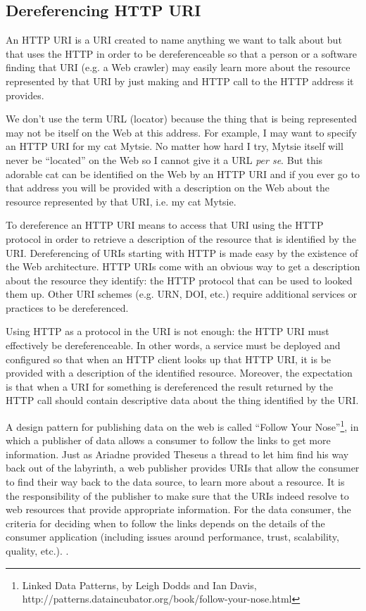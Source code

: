 \hypertarget{dereferencing-http-uri}{%
\subsection{Dereferencing HTTP URI }\label{dereferencing-http-uri}}

An HTTP URI is a URI created to name anything we want to talk about but
that uses the HTTP in order to be dereferenceable so that a person or a
software finding that URI (e.g. a Web crawler) may easily learn more
about the resource represented by that URI by just making and HTTP call
to the HTTP address it provides.

We don't use the term URL (locator) because the thing that is being
represented may not be itself on the Web at this address. For example, I
may want to specify an HTTP URI for my cat Mytsie. No matter how hard I
try, Mytsie itself will never be ``located'' on the Web so I cannot give
it a URL \emph{per se}. But this adorable cat can be identified on the
Web by an HTTP URI and if you ever go to that address you will be
provided with a description on the Web about the resource represented by
that URI, i.e. my cat Mytsie.

To dereference an HTTP URI means to access that URI using the HTTP
protocol in order to retrieve a description of the resource that is
identified by the URI. Dereferencing of URIs starting with HTTP is made
easy by the existence of the Web architecture. HTTP URIs come with an
obvious way to get a description about the resource they identify: the
HTTP protocol that can be used to looked them up. Other URI schemes
(e.g. URN, DOI, etc.) require additional services or practices to be
dereferenced.

Using HTTP as a protocol in the URI is not enough: the HTTP URI must
effectively be dereferenceable. In other words, a service must be
deployed and configured so that when an HTTP client looks up that HTTP
URI, it is be provided with a description of the identified resource.
Moreover, the expectation is that when a URI for something is
dereferenced the result returned by the HTTP call should contain
descriptive data about the thing identified by the URI.

A design pattern for publishing data on the web is called ``Follow Your
Nose''\footnote{Linked Data Patterns, by Leigh Dodds and Ian Davis,
  http://patterns.dataincubator.org/book/follow-your-nose.html}, in
which a publisher of data allows a consumer to follow the links to get
more information. Just as Ariadne provided Theseus a thread to let him
find his way back out of the labyrinth, a web publisher provides URIs
that allow the consumer to find their way back to the data source, to
learn more about a resource. It is the responsibility of the publisher
to make sure that the URIs indeed resolve to web resources that provide
appropriate information. For the data consumer, the criteria for
deciding when to follow the links depends on the details of the consumer
application (including issues around performance, trust, scalability,
quality, etc.). .

